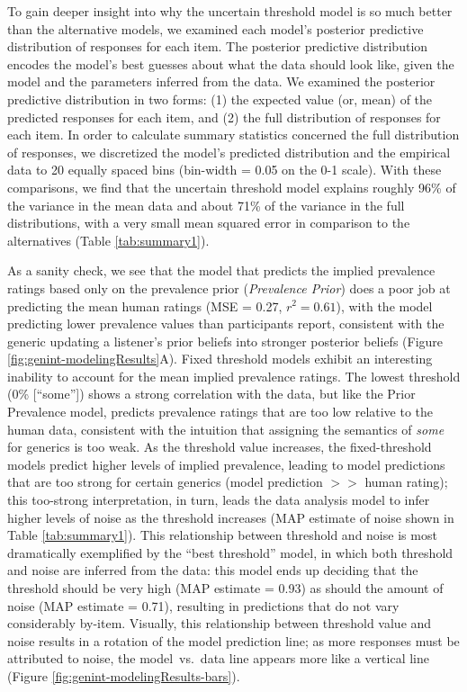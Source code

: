 \documentclass[floatsintext,man]{apa6}
\begin{document}
To gain deeper insight into why the uncertain threshold model is so much better than the alternative models, we examined each model's posterior predictive distribution of responses for each item. The posterior predictive distribution encodes the model's best guesses about what the data should look like, given the model and the parameters inferred from the data. 
We examined the posterior predictive distribution in two forms: (1) the expected value (or, mean) of the predicted responses for each item, and (2) the full distribution of responses for each item. In order to calculate summary statistics concerned the full distribution of responses, we discretized the model's predicted distribution and the empirical data to 20 equally spaced bins (bin-width = 0.05 on the 0-1 scale). 
With these comparisons, we find that the uncertain threshold model explains roughly 96\% of the variance in the mean data and about 71\% of the variance in the full distributions, with a very small mean squared error in comparison to the alternatives (Table \ref{tab:summary1}). 

As a sanity check, we see that the model that predicts the implied prevalence ratings based only on the prevalence prior (\emph{Prevalence Prior}) does a poor job at predicting the mean human ratings (MSE = 0.27, $r^2 = 0.61$), with the model predicting lower prevalence values than participants report, consistent with the generic updating a listener's prior beliefs into stronger posterior beliefs (Figure \ref{fig:genint-modelingResults}A). 
Fixed threshold models exhibit an interesting inability to account for the mean implied prevalence ratings. The lowest threshold (0\% [``some'']) shows a strong correlation with the data, but like the Prior Prevalence model, predicts prevalence ratings that are too low relative to the human data, consistent with the intuition that assigning the semantics of \emph{some} for generics is too weak.
As the threshold value increases, the fixed-threshold models predict higher levels of implied prevalence, leading to model predictions that are too strong for certain generics (model prediction $>>$ human rating); this too-strong interpretation, in turn, leads the data analysis model to infer higher levels of noise as the threshold increases (MAP estimate of noise shown in Table \ref{tab:summary1}). 
This relationship between threshold and noise is most dramatically exemplified by the ``best threshold'' model, in which both threshold and noise are inferred from the data: this model ends up deciding that the threshold should be very high (MAP estimate = 0.93) as should the amount of noise (MAP estimate = 0.71), resulting in predictions that do not vary considerably by-item. 
Visually, this relationship between threshold value and noise results in a rotation of the model prediction line; as more responses must be attributed to noise, the model~vs.~data line appears more like a vertical line  (Figure \ref{fig:genint-modelingResults-bars}). 
\end{document}
